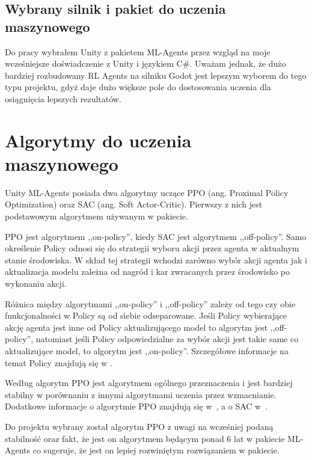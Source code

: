 \documentclass{SGGW-thesis}
\begin{document}
\subsection*{Wybrany silnik i pakiet do uczenia maszynowego}
Do pracy wybrałem Unity z pakietem ML-Agents przez wzgląd na moje wcześniejsze doświadczenie z Unity i językiem C\#. Uważam jednak, że dużo bardziej rozbudowany RL Agents na silniku Godot jest lepszym wyborem do tego typu projektu, gdyż daje dużo większe pole do dostosowania uczenia dla osiągnięcia lepszych rezultatów.

\pagebreak
\section{Algorytmy do uczenia maszynowego}
\label{algorithms}
Unity ML-Agents posiada dwa algorytmy uczące PPO (ang. Proximal Policy Optimization) oraz SAC (ang. Soft Actor-Critic). Pierwszy z nich jest podstawowym algorytmem używanym w pakiecie.

PPO jest algorytmem ,,on-policy'', kiedy SAC jest algorytmem ,,off-policy''. 
Samo określenie Policy odnosi się do strategii wyboru akcji przez agenta w aktualnym stanie środowiska. 
W skład tej strategii wchodzi zarówno wybór akcji agenta jak i aktualizacja modelu zależna od nagród i kar zwracanych przez środowisko po wykonaniu akcji.

Różnica między algorytmami ,,on-policy'' i ,,off-policy'' zależy od tego czy obie funkcjonalności w Policy są od siebie odseparowane. 
Jeśli Policy wybierające akcję agenta jest inne od Policy aktualizującego model to algorytm jest ,,off-policy'', 
natomiast jeśli Policy odpowiedzialne za wybór akcji jest takie same co aktualizujące model, to algorytm jest ,,on-policy''. 
Szczegółowe informacje na temat Policy znajdują się w \cite{RLBook}.

Według \cite{MLAgentsDocs} algorytm PPO jest algorytmem ogólnego przeznaczenia i jest bardziej stabilny w porównaniu z innymi algorytmami uczenia przez wzmacnianie.
Dodatkowe informacje o algorytmie PPO znajdują się w~\cite{PPOArticle}, a o SAC w~\cite{SACArticle}. 


Do projektu wybrany został algorytm PPO z uwagi na wcześniej podaną stabilność oraz fakt, że jest on algorytmem będącym ponad 6 lat w pakiecie ML-Agents co sugeruje, że jest on lepiej rozwiniętym rozwiązaniem w pakiecie.
\end{document}
